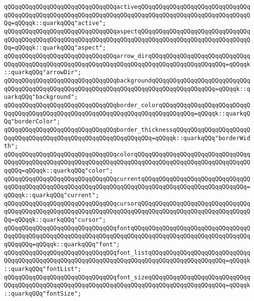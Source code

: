 \newline
\verb|qQQqqQQqqQQqqQQqqQQqqQQqqQQqqQQqactiveqQQqqQQqqQQqqQQqqQQqqQQqqQQqqQQqqQQqqQQqqQQqqQQqqQQqqQQqqQQqqQQqqQQqqQQqqQQqqQQqqQQqqQQqqQQqqQQqqQQqqQQq=qQQqqk::quarkqQQq"active";|\newline
\verb|qQQqqQQqqQQqqQQqqQQqqQQqqQQqqQQqaspectqQQqqQQqqQQqqQQqqQQqqQQqqQQqqQQqqQQqqQQqqQQqqQQqqQQqqQQqqQQqqQQqqQQqqQQqqQQqqQQqqQQqqQQqqQQqqQQqqQQqqQQq=qQQqqk::quarkqQQq"aspect";|\newline
\verb|qQQqqQQqqQQqqQQqqQQqqQQqqQQqqQQqarrow_dirqQQqqQQqqQQqqQQqqQQqqQQqqQQqqQQqqQQqqQQqqQQqqQQqqQQqqQQqqQQqqQQqqQQqqQQqqQQqqQQqqQQqqQQqqQQq=qQQqqk::quarkqQQq"arrowDir";|\newline
\verb|qQQqqQQqqQQqqQQqqQQqqQQqqQQqqQQqbackgroundqQQqqQQqqQQqqQQqqQQqqQQqqQQqqQQqqQQqqQQqqQQqqQQqqQQqqQQqqQQqqQQqqQQqqQQqqQQqqQQqqQQqqQQq=qQQqqk::quarkqQQq"background";|\newline
\verb|qQQqqQQqqQQqqQQqqQQqqQQqqQQqqQQqborder_colorqQQqqQQqqQQqqQQqqQQqqQQqqQQqqQQqqQQqqQQqqQQqqQQqqQQqqQQqqQQqqQQqqQQqqQQqqQQqqQQq=qQQqqk::quarkqQQq"borderColor";|\newline
\verb|qQQqqQQqqQQqqQQqqQQqqQQqqQQqqQQqborder_thicknessqQQqqQQqqQQqqQQqqQQqqQQqqQQqqQQqqQQqqQQqqQQqqQQqqQQqqQQqqQQqqQQq=qQQqqk::quarkqQQq"borderWidth";|\newline
\verb|qQQqqQQqqQQqqQQqqQQqqQQqqQQqqQQqcolorqQQqqQQqqQQqqQQqqQQqqQQqqQQqqQQqqQQqqQQqqQQqqQQqqQQqqQQqqQQqqQQqqQQqqQQqqQQqqQQqqQQqqQQqqQQqqQQqqQQqqQQqqQQq=qQQqqk::quarkqQQq"color";|\newline
\verb|qQQqqQQqqQQqqQQqqQQqqQQqqQQqqQQqcurrentqQQqqQQqqQQqqQQqqQQqqQQqqQQqqQQqqQQqqQQqqQQqqQQqqQQqqQQqqQQqqQQqqQQqqQQqqQQqqQQqqQQqqQQqqQQqqQQqqQQq=qQQqqk::quarkqQQq"current";|\newline
\verb|qQQqqQQqqQQqqQQqqQQqqQQqqQQqqQQqcursorqQQqqQQqqQQqqQQqqQQqqQQqqQQqqQQqqQQqqQQqqQQqqQQqqQQqqQQqqQQqqQQqqQQqqQQqqQQqqQQqqQQqqQQqqQQqqQQqqQQqqQQq=qQQqqk::quarkqQQq"cursor";|\newline
\verb|qQQqqQQqqQQqqQQqqQQqqQQqqQQqqQQqfontqQQqqQQqqQQqqQQqqQQqqQQqqQQqqQQqqQQqqQQqqQQqqQQqqQQqqQQqqQQqqQQqqQQqqQQqqQQqqQQqqQQqqQQqqQQqqQQqqQQqqQQqqQQqqQQq=qQQqqk::quarkqQQq"font";|\newline
\verb|qQQqqQQqqQQqqQQqqQQqqQQqqQQqqQQqfont_listqQQqqQQqqQQqqQQqqQQqqQQqqQQqqQQqqQQqqQQqqQQqqQQqqQQqqQQqqQQqqQQqqQQqqQQqqQQqqQQqqQQqqQQqqQQq=qQQqqk::quarkqQQq"fontList";|\newline
\verb|qQQqqQQqqQQqqQQqqQQqqQQqqQQqqQQqfont_sizeqQQqqQQqqQQqqQQqqQQqqQQqqQQqqQQqqQQqqQQqqQQqqQQqqQQqqQQqqQQqqQQqqQQqqQQqqQQqqQQqqQQqqQQqqQQq=qQQqqk::quarkqQQq"fontSize";|\newline
